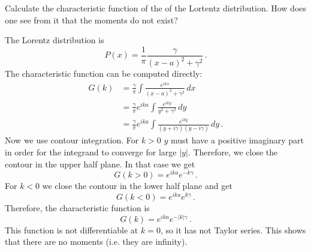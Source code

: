 

Calculate the characteristic function of the of the Lortentz distribution.
How does one see from it that the moments do not exist?


The Lorentz distribution is
\begin{equation*}
P(x) = \frac{1}{\pi} \frac{\gamma}{(x - a)^2 + \gamma^2} \, .
\end{equation*}
The characteristic function can be computed directly:
\begin{align*}
G(k)
&= \frac{\gamma}{\pi} \int \frac{e^{i k x}}{(x - a)^2 + \gamma^2} \, dx \\
&= \frac{\gamma}{\pi} e^{i k a} \int \frac{e^{i k y}}{y^2 + \gamma^2} \, dy \\
&= \frac{\gamma}{\pi} e^{i k a} \int \frac{e^{i k y}}{(y + i\gamma)(y - i\gamma)} \, dy \, .
\end{align*}
Now we use contour integration.
For $k > 0$ $y$ must have a positive imaginary part in order for the integrand to converge for large $|y|$.
Therefore, we close the contour in the upper half plane.
In that case we get
\begin{equation*}
G(k > 0) = e^{i k a} e^{-k \gamma} \, .
\end{equation*}
For $k<0$ we close the contour in the lower half plane and get
\begin{equation*}
G(k < 0) = e^{i k a} e^{k \gamma} \, .
\end{equation*}
Therefore, the characteristic function is
\begin{equation*}
G(k) = e^{i k a} e^{-|k| \gamma} \, .
\end{equation*}
This function is not differentiable at $k=0$, so it has not Taylor series.
This shows that there are no moments (i.e. they are infinity).
